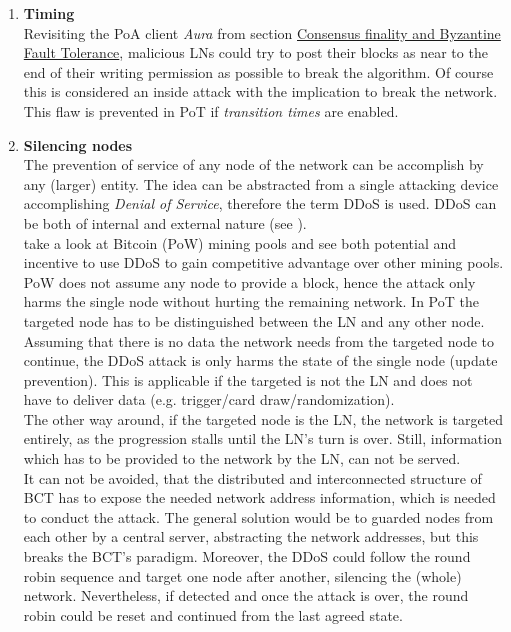 \begin{enumerate}
	\item \textbf{Timing} \\
	Revisiting the \gls{PoA} client \textit{Aura} from section \hyperref[sec:CFandBFT]{Consensus finality and Byzantine Fault Tolerance},
	malicious \gls{LN}s could try to post their blocks as near to the end of their writing permission as possible to break the algorithm.
	Of course this is considered an inside attack with the implication to break the network.
	This flaw is prevented in \gls{PoT} if \textit{transition times} are enabled.
	
	\item \textbf{Silencing nodes} \\
	The prevention of service of any node of the network can be accomplish by any (larger) entity.
	The idea can be abstracted from a single attacking device accomplishing \textit{Denial of Service}, therefore the term \gls{DDoS} is used.
	\gls{DDoS} can be both of internal and external nature (see \citet{Wu.2010}). \\
	\citet[72]{Johnson.2014} take a look at Bitcoin (\gls{PoW}) mining pools and see both potential and incentive to use \gls{DDoS} to gain competitive advantage over other mining pools.
	\gls{PoW} does not assume any node to provide a block, hence  the attack only harms the single node without hurting the remaining network.
	In \gls{PoT} the targeted node has to be distinguished between the \gls{LN} and any other node. \\
	Assuming that there is no data the network needs from the targeted node to continue, the \gls{DDoS} attack is only harms the state of the single node (update prevention).
	This is applicable if the targeted is not the \gls{LN} and does not have to deliver data (e.g. trigger/card draw/randomization). \\
	The other way around, if the targeted node is the \gls{LN}, the network is targeted entirely, as the progression stalls until the \gls{LN}'s turn is over.
	Still, information which has to be provided to the network by the \gls{LN}, can not be served. \\
	It can not be avoided, that the distributed and interconnected structure of \gls{BCT} has to expose the needed network address information, which is needed to conduct the attack.
	The general solution would be to guarded nodes from each other by a central server, abstracting the network addresses, but this breaks the \gls{BCT}'s paradigm.
	Moreover, the \gls{DDoS} could follow the round robin sequence and target one node after another, silencing the (whole) network.
	Nevertheless, if detected and once the attack is over, the round robin could be reset and continued from the last agreed state.
	

\end{enumerate}

